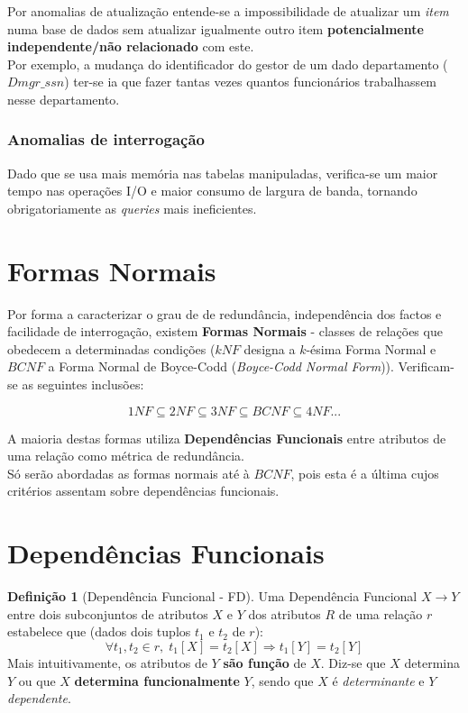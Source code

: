\documentclass[oneside]{book}
\theoremstyle{definition}
\newtheorem{definition}{Definição}
\begin{document}
Por anomalias de atualização entende-se a impossibilidade de atualizar um \textit{item} numa base de dados sem atualizar igualmente outro item \textbf{potencialmente independente/não relacionado} com este. \\
Por exemplo, a mudança do identificador do gestor de um dado departamento ($Dmgr\_ssn$) ter-se ia que fazer tantas vezes quantos funcionários trabalhassem nesse departamento.

\subsubsection*{Anomalias de interrogação}

Dado que se usa mais memória nas tabelas manipuladas, verifica-se um maior tempo nas operações I/O e maior consumo de largura de banda, tornando obrigatoriamente as \textit{queries} mais ineficientes.

\section{Formas Normais}

Por forma a caracterizar o grau de de redundância, independência dos factos e facilidade de interrogação, existem \textbf{Formas Normais} - classes de relações que obedecem a determinadas condições ($kNF$ designa a $k$-ésima Forma Normal e $BCNF$ a Forma Normal de Boyce-Codd (\textit{Boyce-Codd Normal Form})). Verificam-se as seguintes inclusões:

\begin{equation}
    1NF \subseteq 2NF \subseteq 3NF \subseteq BCNF \subseteq 4NF ... 
\end{equation}

A maioria destas formas utiliza \textbf{Dependências Funcionais} entre atributos de uma relação como métrica de redundância.\\
Só serão abordadas as formas normais até à $BCNF$, pois esta é a última cujos critérios assentam sobre dependências funcionais.

\section{Dependências Funcionais}

\begin{definition}[Dependência Funcional - FD]
    Uma Dependência Funcional $X\rightarrow Y$ entre dois subconjuntos de atributos $X$ e $Y$ dos atributos $R$ de uma relação $r$ estabelece que (dados dois tuplos $t_1$ e $t_2$ de $r$):
    \begin{equation*}
        \forall t_1, t_2 \in r, \;t_1[X] = t_2[X] \Rightarrow t_1[Y] = t_2[Y]
    \end{equation*}
    Mais intuitivamente, os atributos de $Y$  \textbf{são função} de $X$. Diz-se que $X$ determina $Y$ ou que $X$ \textbf{determina funcionalmente} $Y$, sendo que $X$ é \textit{determinante} e $Y$ \textit{dependente}.
\end{definition} 
\end{document}
